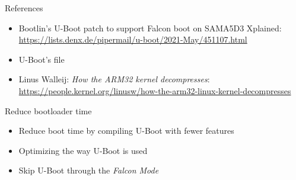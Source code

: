 \begin{frame}{References}
   \begin{itemize}
      \item Bootlin's U-Boot patch to support Falcon boot on SAMA5D3 Xplained:\\
	    \url{https://lists.denx.de/pipermail/u-boot/2021-May/451107.html}
      \item U-Boot's  file
      \item Linus Walleij: {\em How the ARM32 kernel decompresses}:
	    \url{https://people.kernel.org/linusw/how-the-arm32-linux-kernel-decompresses}
   \end{itemize}
\end{frame}

\setuplabframe
{Reduce bootloader time}
{
\begin{itemize}
\item Reduce boot time by compiling U-Boot with fewer features
\item Optimizing the way U-Boot is used
\item Skip U-Boot through the {\em Falcon Mode}
\end{itemize}
}

